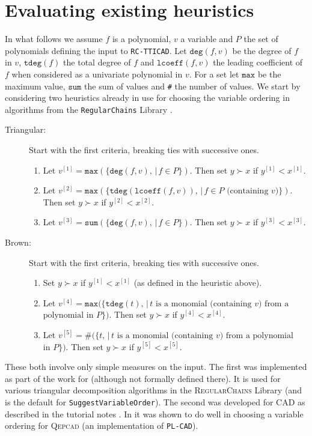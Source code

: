 \documentclass[runningheads,a4paper]{llncs}
\begin{document}
\section{Evaluating existing heuristics}
\label{SEC:Existing}



In what follows we assume $f$ is a polynomial, $v$ a variable and $P$ the set of polynomials defining the input to \texttt{RC-TTICAD}.  Let $\texttt{deg}(f,v)$ be the degree of $f$ in $v$, $\texttt{tdeg}(f)$ the total degree of $f$ and $\texttt{lcoeff}(f,v)$ the leading coefficient of $f$ when considered as a univariate polynomial in $v$.  For a set let $\texttt{max}$ be the maximum value, $\texttt{sum}$ the sum of values and \texttt{\#} the number of values. 
We start by considering two heuristics already in use for choosing the variable ordering in algorithms from the \texttt{RegularChains} Library \cite{RC}.
\begin{description}
\item[Triangular:]  Start with the first criteria, breaking ties with successive ones.
\begin{enumerate}
\item Let $v^{[1]} = \texttt{max}( \{ \texttt{deg}(f, v), \, | \, f \in P \} )$.  
Then set $y \succ x$ if $y^{[1]} < x^{[1]}$.
\item Let $v^{[2]} = \texttt{max}( \{ \texttt{tdeg}(\texttt{lcoeff}(f, v)), \, | \, f \in P \mbox{ (containing $v$)}\} )$.  \\
Then set $y \succ x$ if $y^{[2]} < x^{[2]}$.
\item Let $v^{[3]} = \texttt{sum}( \{ \texttt{deg}(f, v), \, | \, f \in P \} )$. 
Then set $y \succ x$ if $y^{[3]} < x^{[3]}$.
\end{enumerate}
\item[Brown:] Start with the first criteria, breaking ties with successive ones.
\begin{enumerate}
\item Set $y \succ x$ if $y^{[1]} < x^{[1]}$ (as defined in the heuristic above).
\item Let $v^{[4]} = \texttt{max}( \{ \texttt{tdeg}(t), \, | \, \mbox{$t$ is a monomial (containing $v$) from a}$ \\ $\mbox{polynomial in $P$} \} )$.  
Then set $y \succ x$ if $y^{[4]} < x^{[4]}$.
\item Let $v^{[5]} = \texttt{\#}( \{ t, \, | \, \mbox{$t$ is a monomial (containing $v$) from a polynomial}$ \\
$\mbox{in $P$} \} )$.  
Then set $y \succ x$ if $y^{[5]} < x^{[5]}$.
\end{enumerate}
\end{description}
These both involve only simple measures on the input.  The first was implemented as part of the work for \cite{CDLMXXX11} (although not formally defined there).  It is used for various triangular decomposition algorithms in the \textsc{RegularChains} Library (and is the default for \texttt{SuggestVariableOrder}). The second was developed for CAD as described in the tutorial notes \cite{Brown2004}.  In \cite{HEWDPB14} it was shown to do well in choosing a variable ordering for \textsc{Qepcad} (an implementation of \texttt{PL-CAD}). 
\end{document}
